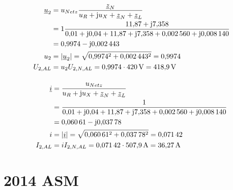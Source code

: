 \documentclass[11pt,a4paper]{scrartcl}
\DeclarePairedDelimiter{\abs}{\lvert}{\rvert}
\renewcommand{\j}{\mathrm{j}}
\newcommand{\z}{\underline{z}}
\renewcommand{\u}{\underline{u}}
\renewcommand{\i}{\underline{i}}
\newcommand{\0}{_{\mybr{0}}}
\newcommand{\1}{_{\mybr{1}}}
\newcommand{\2}{_{\mybr{2}}}
\newcommand{\USA}{U_{2,AL}}
\newcommand{\ISA}{I_{2,AL}}
\newcommand{\USNA}{U_{2,N,AL}}
\newcommand{\ISNA}{I_{2,N,AL}}
\begin{document}
\subsection{}
\begin{align}
\u_2&=u_{Netz}\frac{\z_N}{u_R+\j u_X+\z_N+\z_L}\\
&=1\frac{\num{11.87}+\j\num{7.358}}{\num{0.01}+\j\num{0.04}+\num{11.87}+\j\num{7.358}+\num{0.002560}+\j\num{0.008140}}\\
&=\num{0.9974}-\j\num{0.002443}\\
u_2&=\abs{\u_2}=\sqrt{\num{0.9974}^2+\num{0.002443}^2}=\num{0.9974}\\
\USA&=u_2\USNA=\num{0.9974}\cdot\SI{420}{\volt}=\SI{418.9}{\volt}
\end{align}

\subsection{}
\begin{align}
\i&=\frac{u_{Netz}}{u_R+\j u_X+\z_N+\z_L}\\
&=\frac{1}{\num{0.01}+\j\num{0.04}+\num{11.87}+\j\num{7.358}+\num{0.002560}+\j\num{0.008140}}\\
&=\num{0.06061}-\j\num{0.03778}\\
i&=\abs{\i}=\sqrt{\num{0.06061}^2+\num{0.03778}^2}=\num{0.07142}\\
\ISA&=i\ISNA=\num{0.07142}\cdot\SI{507.9}{\ampere}=\SI{36.27}{\ampere}
\end{align}


\clearpage
\part{2014 ASM}
\section{}
\end{document}
